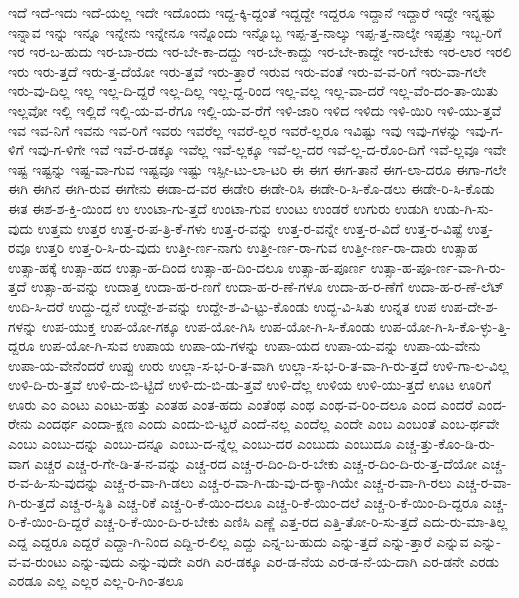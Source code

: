 {ಇದೆ
ಇದೆ-ಇದು
ಇದೆ-ಯಲ್ಲ
ಇದೇ
ಇದೊಂದು
ಇದ್ದ-ಕ್ಕಿ-ದ್ದಂತೆ
ಇದ್ದದ್ದೇ
ಇದ್ದರೂ
ಇದ್ದಾನೆ
ಇದ್ದಾರೆ
ಇದ್ದೇ
ಇನ್ನಷ್ಟು
ಇನ್ನಾವ
ಇನ್ನು
ಇನ್ನೂ
ಇನ್ನೇನು
ಇನ್ನೇನೂ
ಇನ್ನೊಂದು
ಇನ್ನೊಬ್ಬ
ಇಪ್ಪ-ತ್ತ-ನಾಲ್ಕು
ಇಪ್ಪ-ತ್ತ-ನಾಲ್ಕೇ
ಇಪ್ಪತ್ತು
ಇಬ್ಬ-ರಿಗೆ
ಇರ
ಇರ-ಬ-ಹುದು
ಇರ-ಬಾ-ರದು
ಇರ-ಬೇ-ಕಾ-ದದ್ದು
ಇರ-ಬೇ-ಕಾದ್ದು
ಇರ-ಬೇ-ಕಾದ್ದೇ
ಇರ-ಬೇಕು
ಇರ-ಲಾರ
ಇರಲಿ
ಇರು
ಇರು-ತ್ತದೆ
ಇರು-ತ್ತ-ದೆಯೋ
ಇರು-ತ್ತವೆ
ಇರು-ತ್ತಾರೆ
ಇರುವ
ಇರು-ವಂತೆ
ಇರು-ವ-ವ-ರಿಗೆ
ಇರು-ವಾ-ಗಲೇ
ಇರು-ವು-ದಿಲ್ಲ
ಇಲ್ಲ
ಇಲ್ಲ-ದಿ-ದ್ದರೆ
ಇಲ್ಲ-ದಿಲ್ಲ
ಇಲ್ಲ-ದ್ದ-ರಿಂದ
ಇಲ್ಲ-ವಲ್ಲ
ಇಲ್ಲ-ವಾ-ದರೆ
ಇಲ್ಲ-ವೆಂ-ದಂ-ತಾ-ಯಿತು
ಇಲ್ಲವೋ
ಇಲ್ಲಿ
ಇಲ್ಲಿದೆ
ಇಲ್ಲಿ-ಯ-ವ-ರೆಗೂ
ಇಲ್ಲಿ-ಯ-ವ-ರೆಗೆ
ಇಳಿ-ಜಾರಿ
ಇಳಿದ
ಇಳಿದು
ಇಳಿ-ಯಿರಿ
ಇಳಿ-ಯು-ತ್ತವೆ
ಇವ
ಇವ-ನಿಗೆ
ಇವನು
ಇವ-ರಿಗೆ
ಇವರು
ಇವರೆಲ್ಲ
ಇವರೆ-ಲ್ಲರ
ಇವರೆ-ಲ್ಲರೂ
ಇವಿಷ್ಟು
ಇವು
ಇವು-ಗಳನ್ನು
ಇವು-ಗ-ಳಿಗೆ
ಇವು-ಗ-ಳಿಗೇ
ಇವೆ
ಇವೆ-ರ-ಡಕ್ಕೂ
ಇವೆಲ್ಲ
ಇವೆ-ಲ್ಲಕ್ಕೂ
ಇವೆ-ಲ್ಲ-ದರ
ಇವೆ-ಲ್ಲ-ದ-ರೊಂ-ದಿಗೆ
ಇವೆ-ಲ್ಲವೂ
ಇವೇ
ಇಷ್ಟ
ಇಷ್ಟನ್ನು
ಇಷ್ಟ-ವಾ-ಗುವ
ಇಷ್ಟವೂ
ಇಷ್ಟು
ಇಸ್ಪೀ-ಟು-ಲಾ-ಟರಿ
ಈ
ಈಗ
ಈಗ-ತಾನೆ
ಈಗ-ಲಾ-ದರೂ
ಈಗಾ-ಗಲೇ
ಈಗಿ
ಈಗಿನ
ಈಗಿ-ರುವ
ಈಗೇನು
ಈಡಾ-ದ-ವರ
ಈಡೇರಿ
ಈಡೇ-ರಿಸಿ
ಈಡೇ-ರಿ-ಸಿ-ಕೊ-ಡಲು
ಈಡೇ-ರಿ-ಸಿ-ಕೊಡು
ಈತ
ಈಶ-ಶ-ಕ್ತಿ-ಯಿಂದ
ಉ
ಉಂಟಾ-ಗು-ತ್ತದೆ
ಉಂಟಾ-ಗುವ
ಉಂಟು
ಉಂಡರೆ
ಉಗುರು
ಉಡುಗಿ
ಉಡು-ಗಿ-ಸು-ವುದು
ಉತ್ತಮ
ಉತ್ತರ
ಉತ್ತ-ರ-ಪ-ತ್ರಿ-ಕೆ-ಗಳು
ಉತ್ತ-ರ-ವನ್ನು
ಉತ್ತ-ರ-ವನ್ನೇ
ಉತ್ತ-ರ-ವಿದೆ
ಉತ್ತ-ರ-ವಿಷ್ಟೆ
ಉತ್ತ-ರವೂ
ಉತ್ತರಿ
ಉತ್ತ-ರಿ-ಸಿ-ರು-ವುದು
ಉತ್ತೀ-ರ್ಣ-ನಾಗು
ಉತ್ತೀ-ರ್ಣ-ರಾ-ಗುವ
ಉತ್ತೀ-ರ್ಣ-ರಾ-ದಾರು
ಉತ್ಸಾಹ
ಉತ್ಸಾ-ಹಕ್ಕೆ
ಉತ್ಸಾ-ಹದ
ಉತ್ಸಾ-ಹ-ದಿಂದ
ಉತ್ಸಾ-ಹ-ದಿಂ-ದಲೂ
ಉತ್ಸಾ-ಹ-ಪೂರ್ಣ
ಉತ್ಸಾ-ಹ-ಪೂ-ರ್ಣ-ವಾ-ಗಿ-ರು-ತ್ತದೆ
ಉತ್ಸಾ-ಹ-ವನ್ನು
ಉದಾತ್ತ
ಉದಾ-ಹ-ರ-ಣಗೆ
ಉದಾ-ಹ-ರ-ಣೆ-ಗಳೂ
ಉದಾ-ಹ-ರ-ಣೆಗೆ
ಉದಾ-ಹ-ರ-ಣೆ-ಲೆಟ್
ಉದಿ-ಸಿ-ದರೆ
ಉದ್ದು-ದ್ದನೆ
ಉದ್ದೇ-ಶ-ವನ್ನು
ಉದ್ದೇ-ಶ-ವಿ-ಟ್ಟು-ಕೊಂಡು
ಉದ್ಭ-ವಿ-ಸಿತು
ಉನ್ನತ
ಉಪ
ಉಪ-ದೇ-ಶ-ಗಳನ್ನು
ಉಪ-ಯುಕ್ತ
ಉಪ-ಯೋ-ಗಕ್ಕೂ
ಉಪ-ಯೋ-ಗಿಸಿ
ಉಪ-ಯೋ-ಗಿ-ಸಿ-ಕೊಂಡು
ಉಪ-ಯೋ-ಗಿ-ಸಿ-ಕೊ-ಳ್ಳು-ತ್ತಿ-ದ್ದರೂ
ಉಪ-ಯೋ-ಗಿ-ಸುವ
ಉಪಾಯ
ಉಪಾ-ಯ-ಗಳನ್ನು
ಉಪಾ-ಯದ
ಉಪಾ-ಯ-ವನ್ನು
ಉಪಾ-ಯ-ವೇನು
ಉಪಾ-ಯ-ವೇನೆಂದರೆ
ಉಪ್ಪು
ಉರು
ಉಲ್ಲಾ-ಸ-ಭ-ರಿ-ತ-ವಾಗಿ
ಉಲ್ಲಾ-ಸ-ಭ-ರಿ-ತ-ವಾ-ಗಿ-ರು-ತ್ತದೆ
ಉಳಿ-ಗಾ-ಲ-ವಿಲ್ಲ
ಉಳಿ-ದಿ-ರು-ತ್ತವೆ
ಉಳಿ-ದು-ಬಿ-ಟ್ಟಿದೆ
ಉಳಿ-ದು-ಬಿ-ಡು-ತ್ತವೆ
ಉಳಿ-ದೆಲ್ಲ
ಉಳಿಯ
ಉಳಿ-ಯು-ತ್ತದೆ
ಊಟ
ಊರಿಗೆ
ಊರು
ಎಂ
ಎಂಟು
ಎಂಟು-ಹತ್ತು
ಎಂತಹ
ಎಂತ-ಹದು
ಎಂತೆಂಥ
ಎಂಥ
ಎಂಥ-ವ-ರಿಂ-ದಲೂ
ಎಂದ
ಎಂದರೆ
ಎಂದ-ರೇನು
ಎಂದರ್ಥ
ಎಂದಾ-ಕ್ಷಣ
ಎಂದು
ಎಂದು-ಬಿ-ಟ್ಟರೆ
ಎಂದೆ-ನಲ್ಲ
ಎಂದೆಲ್ಲ
ಎಂದೇ
ಎಂಬ
ಎಂಬಂತೆ
ಎಂಬ-ರ್ಥವೇ
ಎಂಬು
ಎಂಬು-ದನ್ನು
ಎಂಬು-ದನ್ನೂ
ಎಂಬು-ದ-ನ್ನೆಲ್ಲ
ಎಂಬು-ದರ
ಎಂಬುದು
ಎಂಬುದೂ
ಎಚ್ಚ-ತ್ತು-ಕೊಂ-ಡಿ-ರು-ವಾಗ
ಎಚ್ಚರ
ಎಚ್ಚ-ರ-ಗೇ-ಡಿ-ತ-ನ-ವನ್ನು
ಎಚ್ಚ-ರದ
ಎಚ್ಚ-ರ-ದಿಂ-ದಿ-ರ-ಬೇಕು
ಎಚ್ಚ-ರ-ದಿಂ-ದಿ-ರು-ತ್ತ-ದೆಯೋ
ಎಚ್ಚ-ರ-ವ-ಹಿ-ಸು-ವುದನ್ನು
ಎಚ್ಚ-ರ-ವಾ-ಗಿ-ಡಲು
ಎಚ್ಚ-ರ-ವಾ-ಗಿ-ಡು-ವು-ದ-ಕ್ಕಾ-ಗಿಯೇ
ಎಚ್ಚ-ರ-ವಾ-ಗಿ-ರಲು
ಎಚ್ಚ-ರ-ವಾ-ಗಿ-ರು-ತ್ತದೆ
ಎಚ್ಚ-ರ-ಸ್ಥಿತಿ
ಎಚ್ಚ-ರಿಕೆ
ಎಚ್ಚ-ರಿ-ಕೆ-ಯಿಂ-ದಲೂ
ಎಚ್ಚ-ರಿ-ಕೆ-ಯಿಂ-ದಲೆ
ಎಚ್ಚ-ರಿ-ಕೆ-ಯಿಂ-ದಿ-ದ್ದರೂ
ಎಚ್ಚ-ರಿ-ಕೆ-ಯಿಂ-ದಿ-ದ್ದರೆ
ಎಚ್ಚ-ರಿ-ಕೆ-ಯಿಂ-ದಿ-ರ-ಬೇಕು
ಎಣಿಸಿ
ಎಣ್ಣೆ
ಎತ್ತ-ರದ
ಎತ್ತಿ-ತೋ-ರಿ-ಸು-ತ್ತದೆ
ಎದು-ರು-ಮಾ-ತಿಲ್ಲ
ಎದ್ದ
ಎದ್ದರೂ
ಎದ್ದರೆ
ಎದ್ದಾ-ಗಿ-ನಿಂದ
ಎದ್ದಿ-ರ-ಲಿಲ್ಲ
ಎದ್ದು
ಎನ್ನ-ಬ-ಹುದು
ಎನ್ನು-ತ್ತದೆ
ಎನ್ನು-ತ್ತಾರೆ
ಎನ್ನುವ
ಎನ್ನು-ವ-ವ-ರುಂಟು
ಎನ್ನು-ವುದು
ಎನ್ನು-ವುದೇ
ಎರಗಿ
ಎರ-ಡಕ್ಕೂ
ಎರ-ಡ-ನೆಯ
ಎರ-ಡ-ನೆ-ಯ-ದಾಗಿ
ಎರ-ಡನೇ
ಎರಡು
ಎರಡೂ
ಎಲ್ಲ
ಎಲ್ಲರ
ಎಲ್ಲ-ರಿ-ಗಿಂ-ತಲೂ
}
